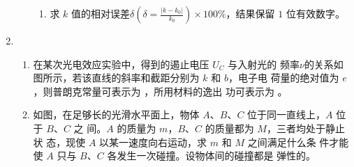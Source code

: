 \begin{enumerate}
\begin{enumerate}
\begin{enumerate}
\item 
求 $ k $ 值的相对误差$\delta\left(\delta=\frac{\left|k-k_{0}\right|}{k_{0}}\right) \times 100 \%$，结果保留 $ 1 $ 位有效数字。
\end{enumerate}
\begin{figure}[h!]
	\flushright
	
\end{figure}





	
\end{enumerate}



\item 
{}
\begin{enumerate}
	\item
在某次光电效应实验中，得到的遏止电压 $ U_{C} $ 与入射光的
频率$ \nu $的关系如图所示，若该直线的斜率和截距分别为 $ k $ 和 $ b $，电子电
荷量的绝对值为 $ e $，则普朗克常量可表示为 \underlinegap ，所用材料的逸出
功可表示为 \underlinegap 。
\begin{figure}[h!]
	\centering
	
\end{figure}






\item 
如图，在足够长的光滑水平面上，物体 $ A $、$ B $、$ C $ 位于同一直线上，$ A $ 位于 $ B $、$ C $ 之
间。$ A $ 的质量为 $ m $，$ B $、$ C $ 的质量都为 $ M $，三者均处于静止状
态，现使 $ A $ 以某一速度向右运动，求 $ m $ 和 $ M $ 之间满足什么条
件才能使 $ A $ 只与 $ B $、$ C $ 各发生一次碰撞。设物体间的碰撞都是
弹性的。
\begin{figure}[h!]
	\flushright
	
\end{figure}




\end{enumerate}
\end{enumerate}
